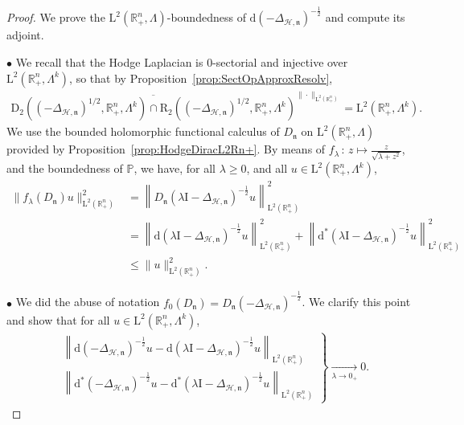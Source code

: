 \documentclass[AHL,Unicode,longabstracts,published]{cedram}
\newcommand{\bbP}{\mathbb{P}}
\newcommand{\bbR}{\mathbb{R}}
\newcommand{\rmd}{\mathrm{d}}
\newcommand{\rmD}{\mathrm{D}}
\newcommand{\rmL}{\mathrm{L}}
\newcommand{\rmR}{\mathrm{R}}
\newcommand{\rmI}{\mathrm{I}}
\newcommand{\clH}{\mathcal{H}}
\newcommand{\fkn}{\mathfrak{n}}
\begin{document}
\begin{proof}
We prove the $\rmL^2(\bbR^n_+,\Lambda)$-boundedness of $\rmd(-\Delta_{\clH,\fkn})^{-\frac{1}{2}}$ and compute its adjoint.

$\bullet$ We recall that the Hodge Laplacian is $0$-sectorial and injective over $\rmL^2(\bbR^n_+,\Lambda^k)$, so that by Proposition~\ref{prop:SectOpApproxResolv},
\begin{align*}
\overline{\rmD_2\left(\left(-\Delta_{\clH,\fkn}\right)^{1/2},\bbR^n_+,\Lambda^k\right)\cap\rmR _2\left(\left(-\Delta_{\clH,\fkn}\right)^{1/2},\bbR^n_+,\Lambda^k\right)}^{\| \cdot \|_{\rmL^2\left(\bbR^n_+\right)}} = \rmL^2\left(\bbR^n_+,\Lambda^k\right).
\end{align*}
We use the bounded holomorphic functional calculus of $D_\fkn$ on $\rmL^2(\bbR^n_+,\Lambda)$ provided by Proposition~\ref{prop:HodgeDiracL2Rn+}. By means of $f_\lambda\,:\,z\mapsto \frac{z}{\sqrt{\lambda +z^2}}$, and the boundedness of $\bbP$, we have, for all $\lambda\geqslant0$, and all $u\in\rmL^2(\bbR^n_+,\Lambda^k)$,
\begin{align*}
\| f_\lambda(D_{\fkn})u\|_{\rmL^2\left(\bbR^n_+\right)}^2
&=\left\| D_{\fkn} (\lambda\rmI -\Delta_{\clH,\fkn})^{-\frac{1}{2}}u\right\|_{\rmL^2\left(\bbR^n_+\right)}^2\\
&=\left\| \rmd(\lambda\rmI -\Delta_{\clH,\fkn})^{-\frac{1}{2}} u \right\|_{\rmL^2\left(\bbR^n_+\right)}^2+\left\| \rmd^\ast\left(\lambda\rmI -\Delta_{\clH,\fkn}\right)^{-\frac{1}{2}} u \right\|_{\rmL^2\left(\bbR^n_+\right)}^2\\ &\leqslant \| u \|_{\rmL^2\left(\bbR^n_+\right)}^2 .
\end{align*}

$\bullet$ We did the abuse of notation $f_0(D_{\fkn})=D_{\fkn}(-\Delta_{\clH,\fkn})^{-\frac{1}{2}}$. We clarify this point and show that for all $u\in\rmL^2(\bbR^n_+,\Lambda^k)$,
\begin{align*}
\left.
\begin{array}{ll}
&\left\| \rmd\left(-\Delta_{\clH,\fkn}\right)^{-\frac{1}{2}} u - \rmd\left(\lambda\rmI -\Delta_{\clH,\fkn}\right)^{-\frac{1}{2}} u\right\|_{\rmL^2\left(\bbR^n_+\right)} \\ 
&\left\| \rmd^\ast\left(-\Delta_{\clH,\fkn}\right)^{-\frac{1}{2}} u - \rmd^\ast\left(\lambda\rmI -\Delta_{\clH,\fkn}\right)^{-\frac{1}{2}} u\right\|_{\rmL^2\left(\bbR^n_+\right)}
\end{array}
\right\}
\xrightarrow[\lambda \rightarrow 0_+]{}0.
\end{align*}


\end{proof}
\end{document}
